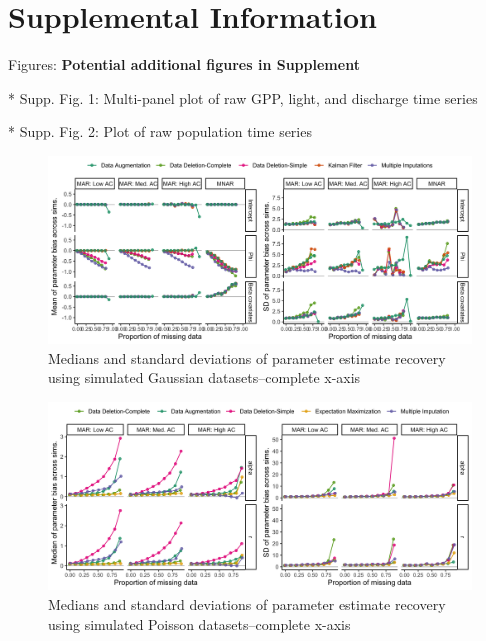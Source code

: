 \documentclass{article}
\begin{document}
\newpage




\newpage



\section{Supplemental Information}
Figures: 
\textbf{Potential additional figures in Supplement}

* Supp. Fig. 1: Multi-panel plot of raw GPP, light, and discharge time series

* Supp. Fig. 2: Plot of raw population time series 
\begin{figure}[h]
    \centering
    \includegraphics[width=\linewidth]{Figures/parameterRecovery_sim_Guassian_medsSD.png}
    \caption{Medians and standard deviations of parameter estimate recovery using simulated Gaussian datasets--complete x-axis}
    \label{fig:GaussianParamRecov_medSD_all}
\end{figure}


\begin{figure}
    \noindent\includegraphics[width = \textwidth]{Figures/parameterRecovery_sim_Poisson_medsSD.png}
    \caption{Medians and standard deviations of parameter estimate recovery using simulated Poisson datasets--complete x-axis}
    \label{fig:PoissonParamRecov_medSD_all}
\end{figure}
\end{document}
